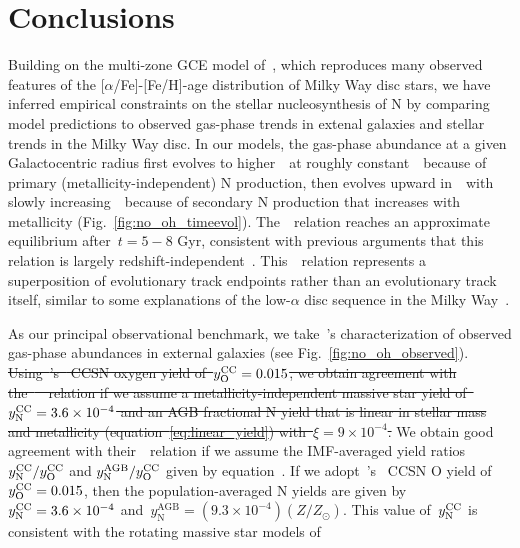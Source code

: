 \documentclass[ms.tex]{subfiles}
\begin{document}
\section{Conclusions}
\label{sec:conclusions}

Building on the multi-zone GCE model of~\citet{Johnson2021}, which reproduces
many observed features of the [$\alpha$/Fe]-[Fe/H]-age distribution of Milky
Way disc stars, we have inferred empirical constraints on the stellar
nucleosynthesis of N by comparing model predictions to observed gas-phase trends
in extenal galaxies and stellar trends in the Milky Way disc.
In our models, the gas-phase abundance at a given Galactocentric radius first
evolves to higher~\oh~at roughly constant~\no~because of primary
(metallicity-independent) N production, then evolves upward in~\no~with slowly
increasing~\oh~because of secondary N production that increases with
metallicity (Fig.~\ref{fig:no_oh_timeevol}).
The~\ohno~relation reaches an approximate equilibrium after~$t = 5 - 8$ Gyr,
consistent with previous arguments that this relation is largely
redshift-independent~\citep{Vincenzo2018, HaydenPawson2021}.
This~\ohno~relation represents a superposition of evolutionary track endpoints
rather than an evolutionary track itself, similar to some explanations of the
low-$\alpha$ disc sequence in the Milky Way~\citep[e.g.][]{Schoenrich2009,
Nidever2014, Buck2020, Sharma2021, Johnson2021}.
\par
As our principal observational benchmark, we take~\citeauthor{Dopita2016}'s
\citeyearpar{Dopita2016} characterization of observed gas-phase abundances
in external galaxies (see Fig.~\ref{fig:no_oh_observed}).
{\color{red}
\sout{
Using~\mbox{\citeauthor{Johnson2021}}'s~\mbox{\citeyearpar{Johnson2021}} CCSN
oxygen yield of~$y_\text{O}^\text{CC} = 0.015$, we obtain agreement with
the~\mbox{\citet{Dopita2016}}~\ohno~relation if we assume a
metallicity-independent
massive star yield of~$y_\text{N}^\text{CC} = 3.6\times10^{-4}$ and an AGB fractional N
yield that is linear in stellar mass and metallicity
(equation~\ref{eq:linear_yield}) with~$\xi = 9\times10^{-4}$.
}
We obtain good agreement with their~\ohno~relation if we assume the
IMF-averaged yield ratios~$y_\text{N}^\text{CC} / y_\text{O}^\text{CC}$ and
$y_\text{N}^\text{AGB} / y_\text{O}^\text{CC}$ given by
equation~.
If we adopt~\citeauthor{Johnson2021}'s~\citeyearpar{Johnson2021} CCSN O yield
of~$y_\text{O}^\text{CC} = 0.015$, then the population-averaged N yields are given by
$y_\text{N}^\text{CC} = 3.6\times10^{-4}$
and~$y_\text{N}^\text{AGB} = (9.3\times10^{-4}) (Z / Z_\odot)$.
}
This value of~$y_\text{N}^\text{CC}$ is consistent with the rotating massive star models of
\end{document}
